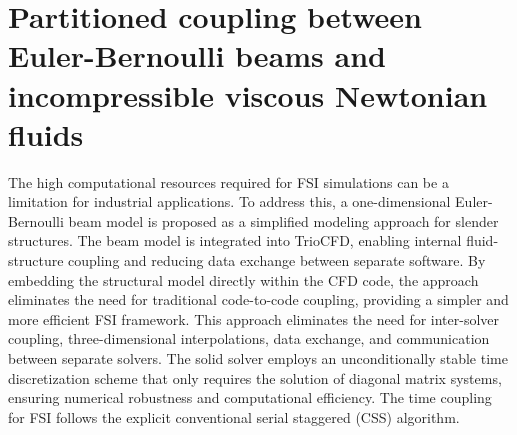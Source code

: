 \chapter{Partitioned coupling between Euler-Bernoulli beams and incompressible viscous Newtonian fluids}



The high computational resources required for FSI simulations can be a limitation for industrial
applications. To address this, a one-dimensional Euler-Bernoulli beam model is proposed as a
simplified modeling approach for slender structures. The beam model is integrated into TrioCFD, enabling internal fluid-structure coupling and reducing data exchange between separate
software. 
By embedding the
structural model directly within the CFD code, the approach eliminates the need for traditional code-to-code coupling, providing a
simpler and more efficient FSI framework. This approach eliminates the need for inter-solver coupling, three-dimensional interpolations, data exchange, and communication between separate
solvers. The solid solver employs an unconditionally stable time
discretization scheme that only requires the solution of diagonal
matrix systems, ensuring numerical robustness and computational
efficiency. The time coupling for FSI follows the explicit conventional serial staggered (CSS) algorithm.

